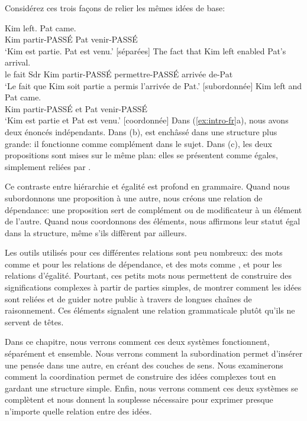 Considérez ces trois façons de relier les mêmes idées de base:

\ea \label{ex:intro-fr}
    \ea \gll Kim left. Pat came.\\
        Kim partir-PASSÉ Pat venir-PASSÉ\\
    \glt `Kim est partie. Pat est venu.' [séparées]
    \ex \gll The fact {\ob}that Kim left{\cb} enabled Pat's arrival.\\
        le fait Sdr Kim partir-PASSÉ permettre-PASSÉ arrivée de-Pat\\
    \glt `Le fait que Kim soit partie a permis l'arrivée de Pat.' [subordonnée]
    \ex \gll Kim left and Pat came.\\
        Kim partir-PASSÉ et Pat venir-PASSÉ\\
    \glt `Kim est partie et Pat est venu.' [coordonnée]
    \z
\z
Dans (\ref{ex:intro-fr}a), nous avons deux énoncés indépendants. Dans (b),  est enchâssé dans une structure plus grande: il fonctionne comme complément dans le sujet. Dans (c), les deux propositions sont mises sur le même plan: elles se présentent comme égales, simplement reliées par .

Ce contraste entre hiérarchie et égalité est profond en grammaire. Quand nous subordonnons une proposition à une autre, nous créons une relation de dépendance: une proposition sert de complément ou de modificateur à un élément de l'autre. Quand nous coordonnons des éléments, nous affirmons leur statut égal dans la structure, même s'ils diffèrent par ailleurs.

Les outils utilisés pour ces différentes relations sont peu nombreux: des mots comme  et  pour les relations de dépendance, et des mots comme ,  et  pour les relations d'égalité. Pourtant, ces petits mots nous permettent de construire des significations complexes à partir de parties simples, de montrer comment les idées sont reliées et de guider notre public à travers de longues chaînes de raisonnement. Ces éléments signalent une relation grammaticale plutôt qu'ils ne servent de têtes.

Dans ce chapitre, nous verrons comment ces deux systèmes fonctionnent, séparément et ensemble. Nous verrons comment la subordination permet d'insérer une pensée dans une autre, en créant des couches de sens. Nous examinerons comment la coordination permet de construire des idées complexes tout en gardant une structure simple. Enfin, nous verrons comment ces deux systèmes se complètent et nous donnent la souplesse nécessaire pour exprimer presque n'importe quelle relation entre des idées.

